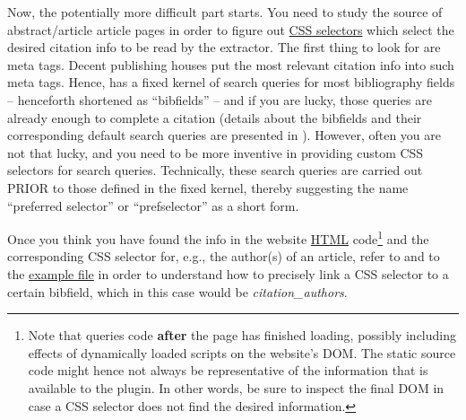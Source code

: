 \documentclass[
a4paper,
12pt,
]
{article}
\begin{document}
Now, the potentially more difficult part starts. You need to study the source of abstract/article article pages in order to figure out \href{https://www.w3schools.com/cssref/css_selectors.asp}{CSS selectors} which select the desired citation info to be read by the extractor. The first thing to look for are meta tags. Decent publishing houses put the most relevant citation info into such meta tags. Hence, {\plgname} has a fixed kernel of search queries for most bibliography fields -- henceforth shortened as ``bibfields'' -- and if you are lucky, those queries are already enough to complete a citation (details about the bibfields and their corresponding default search queries are presented in ).
However, often you are not that lucky, and you need to be more inventive in providing custom CSS selectors for search queries. Technically, these search queries are carried out PRIOR to those defined in the fixed kernel, thereby suggesting the name ``preferred selector'' or ``prefselector'' as a short form.\par
 
Once you think you have found the info in the website \href{https://en.wikipedia.org/wiki/HTML}{HTML} code\footnote{Note that {\plgname} queries code \textbf{after} the page has finished loading, possibly including effects of dynamically loaded scripts on the website's DOM. The static source code might hence not always be representative of the information that is available to the plugin. In other words, be sure to inspect the final DOM in case a CSS selector does not find the desired information.} and the corresponding CSS selector for, e.g., the author(s) of an article, refer to  and to the \href{https://github.com/Langenscheiss/bibitnow/blob/master/extractors/prefselectors/0_EXAMPLE.js}{example file}
in order to understand how to precisely link a CSS selector to a certain bibfield, which in this case would be \textit{citation\_authors}.\par
\end{document}

